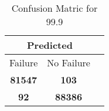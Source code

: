 \begin{table}[] 
\caption{Confusion Matric for 99.9} 
\label{Table: Prediction Accuracy-DMD99.9OnlySunEKF-ignoreReflection-Reflection} 
\centering 
\begin{tabular} 
 {@{}ccc@{}} 
\toprule 
\multicolumn{2}{c}{\textbf{Predicted}}
 \\ \midrule 
\multicolumn{1}{|c|}{Failure} & 
\multicolumn{1}{c|}{No Failure}
 \\ \midrule 
\multicolumn{1}{|c|}{\color{green}\textbf{81547}} & 
\multicolumn{1}{c|}{\color{red}\textbf{103}}
 \\ \midrule 
\multicolumn{1}{|c|}{\color{red}\textbf{92}} & 
\multicolumn{1}{c|}{\color{green}\textbf{88386}}
 \\ \bottomrule 
\end{tabular} 
\end{table} 
